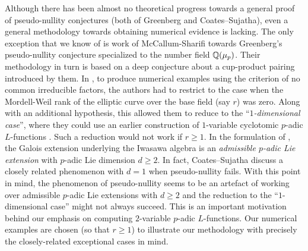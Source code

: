 \documentclass[a4paper,11pt]{article}
\numberwithin{equation}{section}
\begin{document}
Although there has been almost no theoretical progress towards a general proof of pseudo-nullity conjectures (both of Greenberg and Coates--Sujatha), even a general methodology towards obtaining numerical evidence is lacking. The only exception that we know of is work of McCallum-Sharifi \cite{MR2019977} towards Greenberg's pseudo-nullity conjecture specialized to the number field $\mathbb{Q}(\mu_p)$. Their methodology in turn is based on a deep conjecture about a cup-product pairing introduced by them.  In \cite{lei2018codimension}, to produce numerical examples using the criterion of no common irreducible factors, the authors had to restrict to the case when the Mordell-Weil rank of the elliptic curve over the base field (say $r$) was zero. Along with an additional hypothesis, this allowed them to reduce to the ``\textit{$1$-dimensional case}'', where they could use an earlier construction of $1$-variable cyclotomic $p$-adic $L$-functions \cite{PS11}. Such a reduction would not work if $r \geq 1$. In the formulation of \cite[Conjecture B]{MR2148798}, the Galois extension underlying the Iwasawa algebra is an \textit{admissible $p$-adic Lie extension} with $p$-adic Lie dimension $d \geq 2$. In fact, Coates--Sujatha discuss a closely related phenomenon with $d=1$ when pseudo-nullity fails. With this point in mind, the phenomenon of pseudo-nullity seems to be an artefact of working over admissible $p$-adic Lie extensions with $d \geq 2$ and the reduction to the ``$1$-dimensional case'' might not always succeed. This is an important motivation behind our emphasis on computing $2$-variable $p$-adic $L$-functions. Our numerical examples are chosen (so that $r \geq 1$) to illustrate our methodology with precisely the closely-related exceptional cases in mind.
\end{document}
